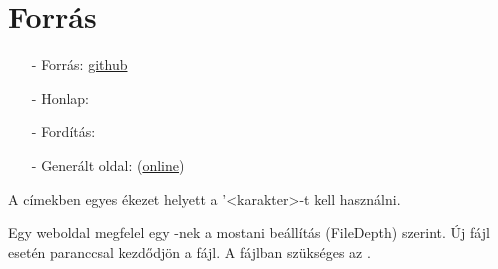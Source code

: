 \chapter{Forr\'as}

\begin{enumerate}
    \item[-] Forrás: \href{https://github.com/a-gondolkodas-orome/latex-tutorial}{github} 
    \item[-] Honlap: 
    \item[-] Fordítás:  
    \item[-] Generált oldal:  (\href{https://a-gondolkodas-orome.github.io/latex-tutorial/index.html}{online})
\end{enumerate}
        
A címekben egyes ékezet helyett a  '<karakter>-t kell használni. 

Egy weboldal megfelel egy \code{\chapter}-nek a mostani beállítás (FileDepth) szerint. Új fájl esetén  paranccsal kezdődjön a fájl. A  fájlban szükséges az \code{}.

